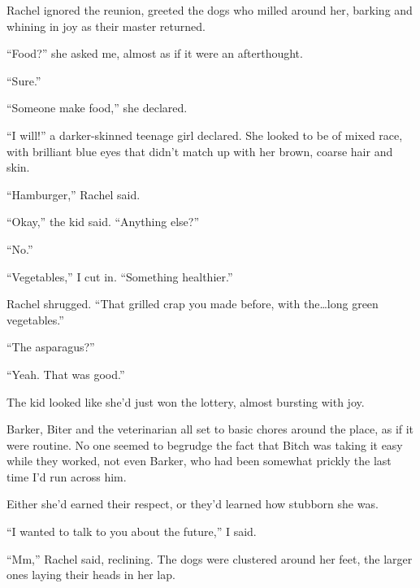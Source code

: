 Rachel ignored the reunion, greeted the dogs who milled around her, barking and whining in joy as their master returned.



``Food?'' she asked me, almost as if it were an afterthought.



``Sure.''



``Someone make food,'' she declared.



``I will!'' a darker-skinned teenage girl declared.  She looked to be of mixed race, with brilliant blue eyes that didn't match up with her brown, coarse hair and skin.



``Hamburger,'' Rachel said.



``Okay,'' the kid said.  ``Anything else?''



``No.''



``Vegetables,'' I cut in.  ``Something healthier.''



Rachel shrugged.  ``That grilled crap you made before, with the\ldots long green vegetables.''



``The asparagus?''



``Yeah.  That was good.''



The kid looked like she'd just won the lottery, almost bursting with joy.



Barker, Biter and the veterinarian all set to basic chores around the place, as if it were routine.  No one seemed to begrudge the fact that Bitch was taking it easy while they worked, not even Barker, who had been somewhat prickly the last time I'd run across him.



Either she'd earned their respect, or they'd learned how stubborn she was.



``I wanted to talk to you about the future,'' I said.



``Mm,'' Rachel said, reclining.  The dogs were clustered around her feet, the larger ones laying their heads in her lap.



